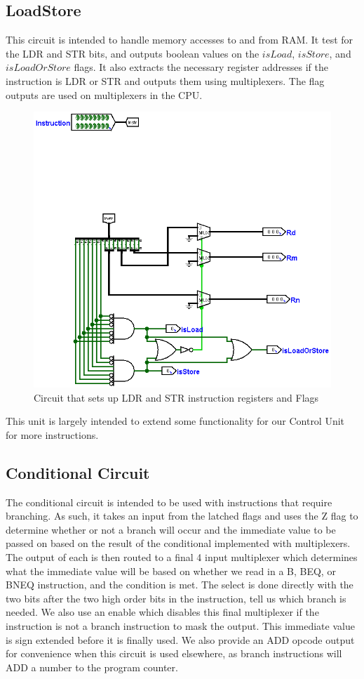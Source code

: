 \documentclass[12pt, letter]{article}
\begin{document}
	\subsection{LoadStore}
	This circuit is intended to handle memory accesses to and from RAM. It test for the LDR and STR bits, and outputs boolean values on the $isLoad$, $isStore$, and $isLoadOrStore$ flags. It also extracts the necessary register addresses if the instruction is LDR or STR and outputs them using multiplexers. The flag outputs are used on multiplexers in the CPU.  
	\newpage
	 \begin{figure}
	 	\centering
	 	\includegraphics[scale = 0.25]{LoadStore}
	 	\caption{Circuit that sets up LDR and STR instruction registers and Flags}
	 	\label{fig:LoadStore}
	 \end{figure}
 
 	This unit is largely intended to extend some functionality for our Control Unit for more instructions.

 	\subsection{Conditional Circuit}
 	The conditional circuit is intended to be used with instructions that require branching. As such, it takes an input from the latched flags and uses the Z flag to determine whether or not a branch will occur and the immediate value to be passed on based on the result of the conditional implemented with multiplexers. The output of each is then routed to a final 4 input multiplexer which determines what the immediate value will be  based on whether we read in a B, BEQ, or BNEQ instruction, and the condition is met. The select is done directly with the two bits after the two high order bits in the instruction, tell us which branch is needed. We also use an enable which disables this final multiplexer if the instruction is not a branch instruction to mask the output. This immediate value is sign extended before it is finally used. We also provide an ADD opcode output for convenience when this circuit is used elsewhere, as branch instructions will ADD a number to the program counter.
 	
\end{document}
